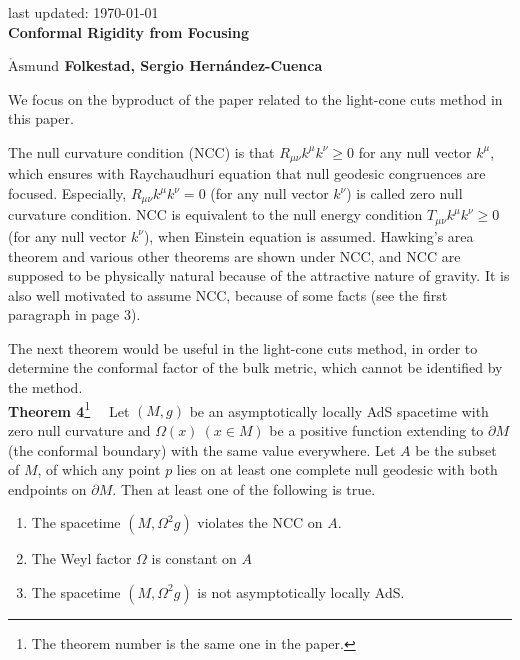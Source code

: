 \documentclass[12pt]{article}
\date{}
\renewcommand{\thefootnote}{\fnsymbol{footnote}}
\begin{document}
{\Large{}
\hfill{\normalsize last updated: \today}
\\[2mm]
\textbf{Conformal Rigidity from Focusing\cite{Folkestad:2021kyz}
}
}

\noindent
\hfill
\textbf{$\mathring{\textrm{A}}\textrm{smund}$ Folkestad, Sergio Hern\' andez-Cuenca}%

\renewcommand{\thefootnote}{\arabic{footnote})}
\setcounter{footnote}{0}
\vspace{12pt}
We focus on the byproduct of the paper related to the light-cone cuts method \cite{Engelhardt:2016wgb,Engelhardt:2016crc,Hernandez-Cuenca:2020ppu} in this paper.

The null curvature condition (NCC) is that $R_{\mu\nu}k^\mu k^\nu \geq 0$ for any null vector $k^\mu$, 
which ensures with Raychaudhuri equation that null geodesic congruences are focused.
Especially, $R_{\mu\nu}k^\mu k^\nu = 0$ (for any null vector $k^\nu$) is called zero null curvature condition.
NCC is equivalent to the null energy condition $T_{\mu\nu}k^\mu k^\nu \geq 0$ (for any null vector $k^\nu$), 
when Einstein equation is assumed.
Hawking's area theorem and various other theorems are shown under NCC, 
and NCC are supposed to be physically natural because of the attractive nature of gravity.
It is also well motivated to assume NCC, because of some facts (see the first paragraph in page 3).

The next theorem would be useful in the light-cone cuts method, 
in order to determine the conformal factor of the bulk metric, which cannot be identified by the method.
\\[12pt]
\textbf{Theorem 4}\footnote{
The theorem number is the same one in the paper.
}~~
Let $(M,g)$ be an asymptotically locally AdS spacetime with zero null curvature and $\Omega(x)~(x\in M)$ be a positive
 function extending to $\partial M$ (the conformal boundary) with the same value everywhere.
Let $A$ be the subset of $M$, of which any point $p$ lies on at least one complete null geodesic with both endpoints on 
$\partial M$.
Then at least one of the following is true.
\begin{enumerate}
	\item The spacetime $(M,\Omega^2g)$ violates the NCC on $A$.
	\item The Weyl factor $\Omega$ is constant on $A$
	\item The spacetime $(M,\Omega^2g)$ is not asymptotically locally AdS.
\end{enumerate}
\end{document}
